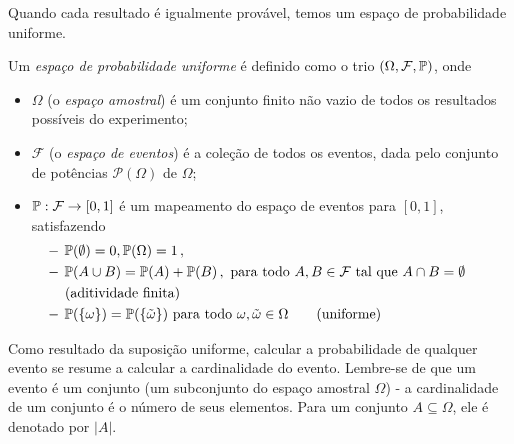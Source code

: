 Quando cada resultado é igualmente provável, temos um espaço de probabilidade uniforme.

\begin{definition}
\label{def:espaço de probabilidade uniforme}
Um \emph{espaço de probabilidade uniforme} é definido como o trio $(\Omega,\mathcal{F},\mathbb{P})$, onde
    \begin{itemize}
        \item $\Omega$ (o \emph{espaço amostral}) é um conjunto finito não vazio de todos os resultados possíveis do experimento;
        \item $\mathcal{F}$ (o \emph{espaço de eventos}) é a coleção de todos os eventos, dada pelo conjunto de potências $\mathcal{P}(\Omega)$ de $\Omega$;
        \item $\mathbb{P}:\mathcal{F}\to [0,1]$ é um mapeamento do espaço de eventos para $[0,1]$, satisfazendo 
        \begin{subequations}
        \begin{align}
            & \hspace{0,3cm} -\, 
                \Pb(\emptyset)=0, \Pb(\Omega) = 1\,, \label{P_prop1} \\
            & \hspace{0,3cm} -\, 
                \Pb(A\cup B) = \Pb(A)+\Pb(B)\,, 
                \text{ para todo } A,B\in\mathcal{F} 
                \text{ tal que } A\cap B = \emptyset 
                \phantom{-----}
                \nonumber \\
            & \hspace{0,8cm} 
                \text{(aditividade finita)}
                \label{fin_ad}\\
            & \hspace{0,3cm} -\,
               \Pb(\{\omega\}) = \Pb(\{\tilde{\omega}\}) \text{ para todo } \omega,\tilde{\omega}\in\Omega  
               \qquad \text{(uniforme)}
               \label{P_prop3}
        \end{align}
        \end{subequations}
    \end{itemize}
\end{definition}

Como resultado da suposição uniforme, calcular a probabilidade de qualquer evento se resume a calcular a cardinalidade do evento. Lembre-se de que um evento é um conjunto (um subconjunto do espaço amostral $\Omega$) - a cardinalidade de um conjunto é o número de seus elementos. Para um conjunto $A\subseteq \Omega$, ele é denotado por $|A|$.

